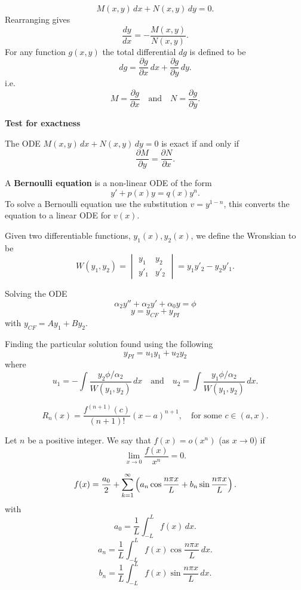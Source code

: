 \documentclass[10pt, a4paper]{article}
\begin{document}
\[
M(x, y)\,dx + N(x, y)\,dy = 0.
\]
Rearranging gives
\[
\frac{dy}{dx} = -\frac{M(x, y)}{N(x, y)}.
\]
For any function $g(x, y)$ the total differential $dg$ is defined to be
\[
dg = \frac{\partial g}{\partial x}\,dx + \frac{\partial g}{\partial y}\,dy.
\]
i.e.
\[
M = \frac{\partial g}{\partial x}\quad\text{and}\quad N = \frac{\partial g}{\partial y}.
\]

\textbf{Test for exactness}

The ODE $M(x, y)\,dx + N(x, y)\,dy = 0$ is exact if and only if
\[
\frac{\partial M}{\partial y} = \frac{\partial N}{\partial x}.
\]

A \textbf{Bernoulli equation} is a non-linear ODE of the form
\[
y' + p(x)y = q(x)y ^ n.
\]
To solve a Bernoulli equation use the substitution $v = y ^ {1 - n}$,
this converts the equation to a linear ODE for $v(x)$.

\begin{definition}
    Given two differentiable functions,
    $y_1(x), y_2(x)$,
    we define the Wronskian to be
    \[
    W(y_1, y_2) = \begin{vmatrix}
        y_1 & y_2 \\ y'_1 & y'_2
    \end{vmatrix}
    = y_1y'_2 - y_2y'_1.
    \]
\end{definition}

Solving the ODE
\[
\alpha_2y'' + \alpha_2y' + \alpha_0y = \phi
\]
\[
y = y_{CF} + y_{PI}
\]
with $y_{CF} = Ay_1 + By_2$.

Finding the particular solution found using the following
\[
y_{PI} = u_1y_1 + u_2y_2
\]
where
\[
u_1 = -\int\frac{y_2 \phi / \alpha_2}{W(y_1, y_2)}\,dx\quad\text{and}\quad
u_2 = \int\frac{y_1 \phi / \alpha_2}{W(y_1, y_2)}\,dx.
\]


\begin{definition}
    \[
    R_n(x) = \frac{f ^ {(n + 1)}(c)}{(n + 1)!}(x - a) ^ {n + 1},\quad\text{for some $c \in (a, x)$}.
    \]
\end{definition}

\begin{definition}
    Let $n$ be a positive integer.
    We say that $f(x) = o(x ^ n)$ (as $x \rightarrow 0$)
    if
    \[
    \lim_{x \rightarrow 0}\frac{f(x)}{x ^ n} = 0.
    \]
\end{definition}

\begin{definition}
    \[
    f(x) = \frac{a_0}{2} + \sum_{k = 1}^{\infty}\left(a_n\cos\frac{n\pi x}{L} + b_n\sin\frac{n\pi x}{L}\right).
    \]
    with
    \[
    a_0 = \frac{1}{L}\int_{-L}^{L}f(x)\,dx.
    \]
    \[
    a_n = \frac{1}{L}\int_{-L}^{L}f(x)\cos\frac{n\pi x}{L}\,dx.
    \]
    \[
    b_n = \frac{1}{L}\int_{-L}^{L}f(x)\sin\frac{n\pi x}{L}\,dx.
    \]
\end{definition}
\end{document}
